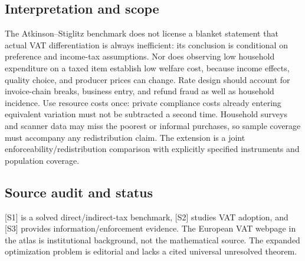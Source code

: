 \documentclass[11pt,a4paper]{article}
\begin{document}
\subsection*{Interpretation and scope}
The Atkinson--Stiglitz benchmark does not license a blanket statement that actual VAT differentiation is always inefficient: its conclusion is conditional on preference and income-tax assumptions. Nor does observing low household expenditure on a taxed item establish low welfare cost, because income effects, quality choice, and producer prices can change. Rate design should account for invoice-chain breaks, business entry, and refund fraud as well as household incidence. Use resource costs once: private compliance costs already entering equivalent variation must not be subtracted a second time. Household surveys and scanner data may miss the poorest or informal purchases, so sample coverage must accompany any redistribution claim. The extension is a joint enforceability/redistribution comparison with explicitly specified instruments and population coverage.

\subsection*{Source audit and status}
[S1] is a solved direct/indirect-tax benchmark, [S2] studies VAT adoption, and [S3] provides information/enforcement evidence. The European VAT webpage in the atlas is institutional background, not the mathematical source. The expanded optimization problem is editorial and lacks a cited universal unresolved theorem.
\end{document}
